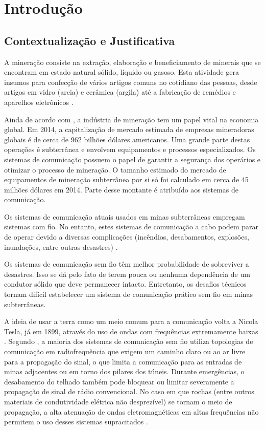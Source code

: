 \chapter[Introdução]{Introdução}

\section{Contextualização e Justificativa}

A mineração consiste na extração, elaboração e beneficiamento de minerais que se encontram em estado natural sólido, líquido ou gasoso. Esta atividade gera insumos para confecção de vários artigos comuns no cotidiano das pessoas, desde artigos em vidro (areia) e cerâmica (argila) até a fabricação de remédios e aparelhos eletrônicos \cite{forooshani2013survey}.

Ainda de acordo com \cite{forooshani2013survey}, a indústria de mineração tem um papel vital na economia global. Em 2014, a capitalização de mercado estimada de empresas mineradoras globais é de cerca de 962 bilhões dólares americanos. Uma grande parte destas operações é subterrânea e envolvem equipamentos e processos especializados. Os sistemas de comunicação possuem o papel de garantir a segurança dos operários e otimizar o processo de mineração. O tamanho estimado do mercado de equipamentos de mineração subterrânea por si só foi calculado em cerca de 45 milhões dólares em 2014. Parte desse montante é atribuído aos sistemas de comunicação.


Os sistemas de comunicação atuais usados em minas subterrâneas empregam sistemas com fio. No entanto, estes sistemas de comunicação a cabo podem parar de operar devido a diversas complicações (incêndios, desabamentos, explosões, inundações, entre outras desastres) \cite{barkand2006through}.

Os sistemas de comunicação sem fio têm melhor probabilidade de sobreviver a desastres. Isso se dá pelo fato de terem pouca ou nenhuma dependência de um condutor sólido que deve permanecer intacto. Entretanto, os desafios técnicos tornam difícil estabelecer um sistema de comunicação prático sem fio em minas subterrâneas.

A ideia de usar a terra como um meio comum para a comunicação volta a Nicola Tesla, já em 1899, através do uso de ondas com frequências extremamente baixas \cite{wheeler1961radio}. Segundo \cite{barkand2006through}, a maioria dos sistemas de comunicação sem fio utiliza topologias de comunicação em radiofrequência que exigem um caminho claro ou ao ar livre para a propagação do sinal, o que limita a comunicação para as entradas de minas adjacentes ou em torno dos pilares dos túneis. Durante emergências, o desabamento do telhado também pode bloquear ou limitar severamente a propagação de sinal de rádio convencional. No caso em que rochas (entre outros materiais de condutividade elétrica não desprezível) se tornam o meio de propagação, a alta atenuação de ondas eletromagnéticas em altas frequências não permitem o uso desses sistemas supracitados \cite{raab1995signal}.

